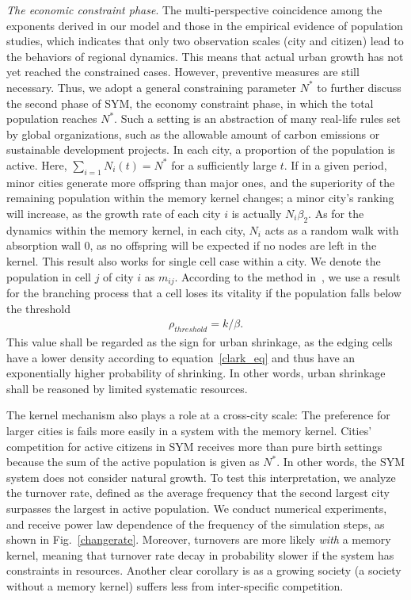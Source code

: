 \documentclass[reprint,unsortedaddress,amsmath,amssymb,aps,prl,showkeys]{revtex4-2}
\begin{document}
\textit{The economic constraint phase}. The multi-perspective coincidence among the exponents derived in our model and those in the empirical evidence of population studies, which indicates that only two observation scales (city and citizen) lead to the behaviors of regional dynamics. This means that actual urban growth has not yet reached the constrained cases. However, preventive measures are still necessary. Thus, we adopt a general constraining parameter $N^*$ to further discuss the second phase of SYM, the economy constraint phase, in which the total population reaches $N^*$. Such a setting is an abstraction of many real-life rules set by global organizations, such as the allowable amount of carbon emissions or sustainable development projects. In each city, a proportion of the population is active. Here, $\sum_{i=1} N_i(t) = N^*$ for a sufficiently large $t$. If in a given period, minor cities generate more offspring than major ones, and the superiority of the remaining population within the memory kernel changes; a minor city's ranking will increase, as the growth rate of each city $i$ is actually $N_i\beta_2$. As for the dynamics within the memory kernel, in each city, $N_i$ acts as a random walk with absorption wall $0$, as no offspring will be expected if no nodes are left in the kernel. This result also works for single cell case within a city. We denote the population in cell $j$ of city $i$ as $m_{ij}$. According to the method in~\cite{durrett1999essentials}, we use a result for the branching process that a cell loses its vitality if the population falls below the threshold \begin{align}\rho_{threshold} = k/\beta.\end{align} This value shall be regarded as the sign for urban shrinkage, as the edging cells have a lower density according to equation~\ref{clark_eq} and thus have an exponentially higher probability of shrinking. In other words, urban shrinkage shall be reasoned by limited systematic resources. 

The kernel mechanism also plays a role at a cross-city scale: The preference for larger cities is fails more easily in a system with the memory kernel. Cities' competition for active citizens in SYM receives more than pure birth settings because the sum of the active population is given as $N^*$. In other words, the SYM system does not consider natural growth. To test this interpretation, we analyze the turnover rate, defined as the average frequency that the second largest city surpasses the largest in active population. We conduct numerical experiments, and receive power law dependence of the frequency of the simulation steps, as shown in Fig.~\ref{changerate}. Moreover, turnovers are more likely \textit{with} a memory kernel, meaning that turnover rate decay in probability slower if the system has constraints in resources. Another clear corollary is as a growing society (a society without a memory kernel) suffers less from inter-specific competition.
\end{document}
